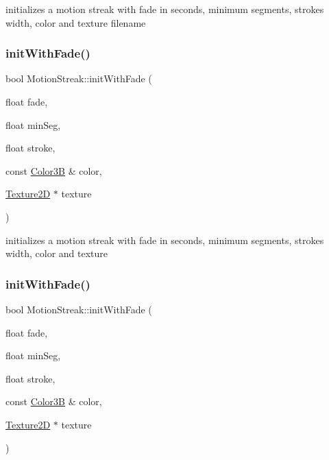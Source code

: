 initializes a motion streak with fade in seconds, minimum segments, stroke\textquotesingle{}s width, color and texture filename \mbox{\label{classMotionStreak_a5905898a3f71dad4c4582988556878a4}} 
\subsubsection{\texorpdfstring{init\+With\+Fade()}{initWithFade()}\hspace{0.1cm}{\footnotesize\ttfamily [3/4]}}
{\footnotesize\ttfamily bool Motion\+Streak\+::init\+With\+Fade (\begin{DoxyParamCaption}\item[{float}]{fade,  }\item[{float}]{min\+Seg,  }\item[{float}]{stroke,  }\item[{const \hyperlink{structColor3B}{Color3B} \&}]{color,  }\item[{\hyperlink{classTexture2D}{Texture2D} $\ast$}]{texture }\end{DoxyParamCaption})}

initializes a motion streak with fade in seconds, minimum segments, stroke\textquotesingle{}s width, color and texture \mbox{\label{classMotionStreak_a5905898a3f71dad4c4582988556878a4}} 
\subsubsection{\texorpdfstring{init\+With\+Fade()}{initWithFade()}\hspace{0.1cm}{\footnotesize\ttfamily [4/4]}}
{\footnotesize\ttfamily bool Motion\+Streak\+::init\+With\+Fade (\begin{DoxyParamCaption}\item[{float}]{fade,  }\item[{float}]{min\+Seg,  }\item[{float}]{stroke,  }\item[{const \hyperlink{structColor3B}{Color3B} \&}]{color,  }\item[{\hyperlink{classTexture2D}{Texture2D} $\ast$}]{texture }\end{DoxyParamCaption})}


